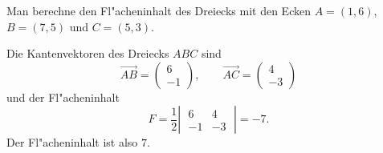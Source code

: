 \begin{beispiel}
Man berechne den Fl"acheninhalt des Dreiecks mit den Ecken
$A=(1,6)$, $B=(7,5)$ und $C=(5,3)$.

\smallskip

{\parindent 0pt Die Kantenvektoren} des Dreiecks $ABC$ sind
\[
\overrightarrow{AB}=\begin{pmatrix}6\\-1\end{pmatrix}
,\qquad
\overrightarrow{AC}=\begin{pmatrix}4\\-3\end{pmatrix}
\]
und der Fl"acheninhalt
\[
F=\frac12\left|\;\begin{matrix}
   6&  4\\
  -1& -3
\end{matrix}\;\right|=
-7
.
\]
Der Fl"acheninhalt ist also $7$.
\end{beispiel}

